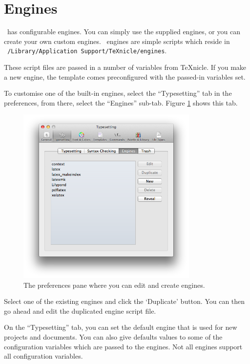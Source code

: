 \section{Engines }
\label{sec:engines}

\texnicle\ has configurable engines. You can simply use the supplied engines, or
you can create your own custom engines.  \texnicle\ engines are simple scripts
which reside in \texttt{~/Library/Application Support/TeXnicle/engines}.

These script files are passed in a number of variables from TeXnicle. If you
make a new engine, the template comes preconfigured with the passed-in
variables set.

To customise one of the built-in engines, select the ``Typesetting'' tab in the
preferences, from there, select the ``Engines'' sub-tab. Figure \ref{fig:engines_pref_pane}
shows this tab.


\begin{figure}[htbp]
\centering
\includegraphics[width=0.8\textwidth]{reference/engines_pref_pane.png}
\caption{The preferences pane where you can edit and create engines.}
\label{fig:engines_pref_pane}
\end{figure}


Select one of the existing engines and click the ‘Duplicate’ button. You can
then go ahead and edit the duplicated engine script file.

On the ``Typesetting'' tab, you can set the default engine that is used for new
projects and documents. You can also give defaults values to some of the
configuration variables which are passed to the engines. Not all engines
support all configuration variables.


